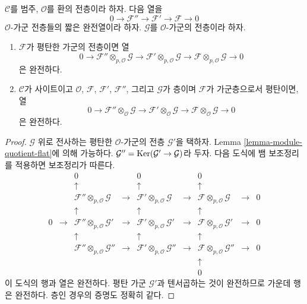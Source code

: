 \begin{lemma}
\label{lemma-flat-tor-zero}
$\mathcal{C}$를 범주, $\mathcal{O}$를 환의 전층이라 하자. 다음 열을
$$
0 \to \mathcal{F}'' \to \mathcal{F}' \to \mathcal{F} \to 0
$$
$\mathcal{O}$-가군 전층들의 짧은 완전열이라 하자. $\mathcal{G}$를
$\mathcal{O}$-가군의 전층이라 하자.
\begin{enumerate}
\item $\mathcal{F}$가 평탄한 가군의 전층이면 열
$$
0 \to
\mathcal{F}'' \otimes_{p, \mathcal{O}} \mathcal{G} \to
\mathcal{F}' \otimes_{p, \mathcal{O}} \mathcal{G} \to
\mathcal{F} \otimes_{p, \mathcal{O}} \mathcal{G} \to 0
$$
은 완전하다.
\item $\mathcal{C}$가 사이트이고 $\mathcal{O}$,
$\mathcal{F}$, $\mathcal{F}'$, $\mathcal{F}''$, 그리고 $\mathcal{G}$가
층이며 $\mathcal{F}$가 가군층으로서 평탄이면, 열
$$
0 \to
\mathcal{F}'' \otimes_\mathcal{O} \mathcal{G} \to
\mathcal{F}' \otimes_\mathcal{O} \mathcal{G} \to
\mathcal{F} \otimes_\mathcal{O} \mathcal{G} \to 0
$$
은 완전하다.
\end{enumerate}
\end{lemma}

\begin{proof}
$\mathcal{G}$ 위로 전사하는 평탄한 $\mathcal{O}$-가군의 전층
$\mathcal{G}'$을 택하자. Lemma \ref{lemma-module-quotient-flat}에 의해
가능하다. $\mathcal{G}'' = \mathop{\mathrm{Ker}}(\mathcal{G}' \to \mathcal{G})$라 두자.
다음 도식에 뱀 보조정리를 적용하면 보조정리가 따른다.
$$
\begin{matrix}
 & & 0 & & 0 & & 0 & & \\
 & & \uparrow & & \uparrow & & \uparrow & & \\
 & & \mathcal{F}'' \otimes_{p, \mathcal{O}} \mathcal{G} & \to &
     \mathcal{F}' \otimes_{p, \mathcal{O}} \mathcal{G} & \to &
     \mathcal{F} \otimes_{p, \mathcal{O}} \mathcal{G} & \to & 0 \\
 & & \uparrow & & \uparrow & & \uparrow & & \\
0 & \to & \mathcal{F}'' \otimes_{p, \mathcal{O}} \mathcal{G}' & \to &
          \mathcal{F}' \otimes_{p, \mathcal{O}} \mathcal{G}' & \to &
          \mathcal{F} \otimes_{p, \mathcal{O}} \mathcal{G}' & \to & 0 \\
 & & \uparrow & & \uparrow & & \uparrow & & \\
 & & \mathcal{F}'' \otimes_{p, \mathcal{O}} \mathcal{G}'' & \to &
     \mathcal{F}' \otimes_{p, \mathcal{O}} \mathcal{G}'' & \to &
     \mathcal{F} \otimes_{p, \mathcal{O}} \mathcal{G}'' & \to & 0 \\
 & & & & & & \uparrow & & \\
 & & & & & & 0 & &
\end{matrix}
$$
이 도식의 행과 열은 완전하다. 평탄 가군 $\mathcal{G}'$과 텐서곱하는 것이
완전하므로 가운데 행은 완전하다. 층인 경우의 증명도 정확히 같다.
\end{proof}

